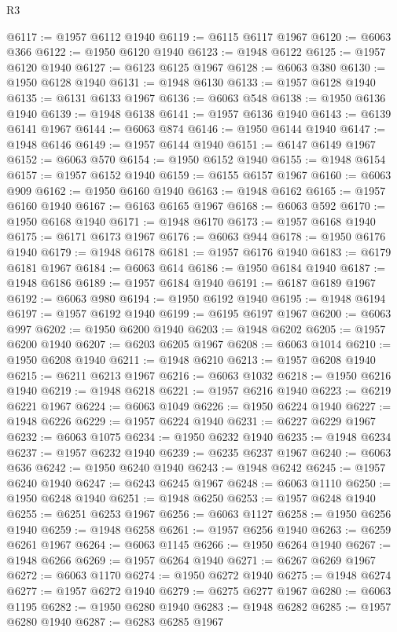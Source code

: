 \begin{lexlean}{R3}
\begin{coremodule}
@6117 := @1957 @6112 @1940
@6119 := @6115 @6117 @1967
@6120 := @6063 @366
@6122 := @1950 @6120 @1940
@6123 := @1948 @6122
@6125 := @1957 @6120 @1940
@6127 := @6123 @6125 @1967
@6128 := @6063 @380
@6130 := @1950 @6128 @1940
@6131 := @1948 @6130
@6133 := @1957 @6128 @1940
@6135 := @6131 @6133 @1967
@6136 := @6063 @548
@6138 := @1950 @6136 @1940
@6139 := @1948 @6138
@6141 := @1957 @6136 @1940
@6143 := @6139 @6141 @1967
@6144 := @6063 @874
@6146 := @1950 @6144 @1940
@6147 := @1948 @6146
@6149 := @1957 @6144 @1940
@6151 := @6147 @6149 @1967
@6152 := @6063 @570
@6154 := @1950 @6152 @1940
@6155 := @1948 @6154
@6157 := @1957 @6152 @1940
@6159 := @6155 @6157 @1967
@6160 := @6063 @909
@6162 := @1950 @6160 @1940
@6163 := @1948 @6162
@6165 := @1957 @6160 @1940
@6167 := @6163 @6165 @1967
@6168 := @6063 @592
@6170 := @1950 @6168 @1940
@6171 := @1948 @6170
@6173 := @1957 @6168 @1940
@6175 := @6171 @6173 @1967
@6176 := @6063 @944
@6178 := @1950 @6176 @1940
@6179 := @1948 @6178
@6181 := @1957 @6176 @1940
@6183 := @6179 @6181 @1967
@6184 := @6063 @614
@6186 := @1950 @6184 @1940
@6187 := @1948 @6186
@6189 := @1957 @6184 @1940
@6191 := @6187 @6189 @1967
@6192 := @6063 @980
@6194 := @1950 @6192 @1940
@6195 := @1948 @6194
@6197 := @1957 @6192 @1940
@6199 := @6195 @6197 @1967
@6200 := @6063 @997
@6202 := @1950 @6200 @1940
@6203 := @1948 @6202
@6205 := @1957 @6200 @1940
@6207 := @6203 @6205 @1967
@6208 := @6063 @1014
@6210 := @1950 @6208 @1940
@6211 := @1948 @6210
@6213 := @1957 @6208 @1940
@6215 := @6211 @6213 @1967
@6216 := @6063 @1032
@6218 := @1950 @6216 @1940
@6219 := @1948 @6218
@6221 := @1957 @6216 @1940
@6223 := @6219 @6221 @1967
@6224 := @6063 @1049
@6226 := @1950 @6224 @1940
@6227 := @1948 @6226
@6229 := @1957 @6224 @1940
@6231 := @6227 @6229 @1967
@6232 := @6063 @1075
@6234 := @1950 @6232 @1940
@6235 := @1948 @6234
@6237 := @1957 @6232 @1940
@6239 := @6235 @6237 @1967
@6240 := @6063 @636
@6242 := @1950 @6240 @1940
@6243 := @1948 @6242
@6245 := @1957 @6240 @1940
@6247 := @6243 @6245 @1967
@6248 := @6063 @1110
@6250 := @1950 @6248 @1940
@6251 := @1948 @6250
@6253 := @1957 @6248 @1940
@6255 := @6251 @6253 @1967
@6256 := @6063 @1127
@6258 := @1950 @6256 @1940
@6259 := @1948 @6258
@6261 := @1957 @6256 @1940
@6263 := @6259 @6261 @1967
@6264 := @6063 @1145
@6266 := @1950 @6264 @1940
@6267 := @1948 @6266
@6269 := @1957 @6264 @1940
@6271 := @6267 @6269 @1967
@6272 := @6063 @1170
@6274 := @1950 @6272 @1940
@6275 := @1948 @6274
@6277 := @1957 @6272 @1940
@6279 := @6275 @6277 @1967
@6280 := @6063 @1195
@6282 := @1950 @6280 @1940
@6283 := @1948 @6282
@6285 := @1957 @6280 @1940
@6287 := @6283 @6285 @1967

\end{coremodule}
\end{lexlean}
